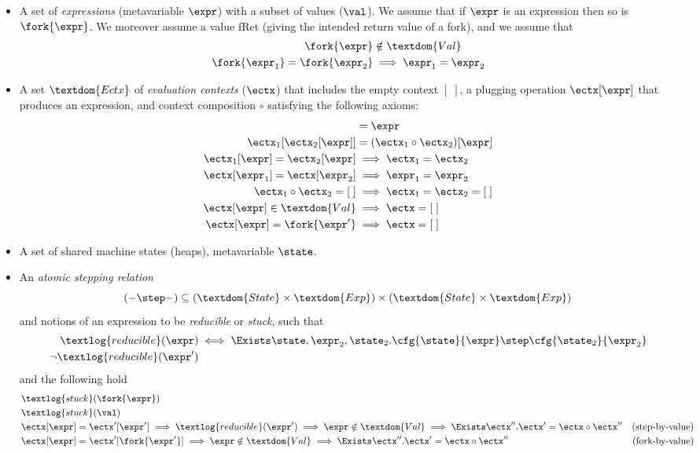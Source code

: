 \begin{itemize}
\item A set  of \emph{expressions} (metavariable $\expr$) with a
  subset  of values ($\val$).  We assume that if $\expr$ is an
  expression then so is $\fork{\expr}$.  We moreover assume a value
  \textsf{fRet} (giving the intended return value of a fork), and we assume that
  \begin{align*}
    \fork{\expr} &\notin \textdom{Val} \\
    \fork{\expr_1} = \fork{\expr_2} &\implies \expr_1 = \expr_2
  \end{align*}
\item A set $\textdom{Ectx}$ of \emph{evaluation contexts} ($\ectx$) that includes the empty context $[\; ]$,
  a plugging operation $\ectx[\expr]$ that produces an expression, and context composition $\circ$
  satisfying the following axioms:
  \begin{align*}
    [\; ][ \expr ] &= \expr \\
    \ectx_1[\ectx_2[\expr]] &= (\ectx_1 \circ \ectx_2) [\expr] \\
    \ectx_1[\expr] = \ectx_2[\expr] &\implies \ectx_1 = \ectx_2 \\
    \ectx[\expr_1] = \ectx[\expr_2] &\implies \expr_1 = \expr_2 \\
    \ectx_1 \circ \ectx_2 = [\; ] &\implies \ectx_1 = \ectx_2 = [\; ] \\
    \ectx[\expr] \in \textdom{Val} &\implies \ectx = [\;] \\
    \ectx[\expr] = \fork{\expr'} &\implies \ectx = [\;]
  \end{align*}

\item A set  of shared machine states (\eg heaps), metavariable $\state$.
\item An \emph{atomic stepping relation} \[
  (- \step -) \subseteq (\textdom{State} \times \textdom{Exp}) \times (\textdom{State} \times \textdom{Exp})
\]
and notions of an expression to be \emph{reducible} or \emph{stuck}, such that
\begin{align*}
  \textlog{reducible}(\expr) &\iff \Exists \state, \expr_2, \state_2. \cfg{\state}{\expr} \step \cfg{\state_2}{\expr_2} \\
   \lnot \textlog{reducible}(\expr')
\end{align*}
and the following hold
\begin{align*}
&\textlog{stuck}(\fork{\expr})& \\
 &\textlog{stuck}(\val)&\\
 &\ectx[\expr] = \ectx'[\expr'] \implies \textlog{reducible}(\expr') \implies
  \expr \notin \textdom{Val} \implies \Exists \ectx''. \ectx' = \ectx \circ \ectx'' &\mbox{(step-by-value)} \\
 &\ectx[\expr] = \ectx'[\fork{\expr'}] \implies
  \expr \notin \textdom{Val} \implies \Exists \ectx''. \ectx' = \ectx \circ \ectx'' &\mbox{(fork-by-value)} \\
\end{align*}


\end{itemize}
